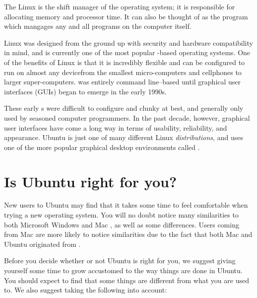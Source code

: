 The Linux  is the shift manager of the operating system; it is responsible for allocating memory and processor time. It can also be thought of as the program which mangages any and all programs on the computer itself.

Linux was designed from the ground up with security and hardware compatibility in mind, and is currently one of the most popular -based operating systems. One of the benefits of Linux is that it is incredibly flexible and can be configured to run on almost any device\dash from the smallest micro-computers and cellphones to larger super-computers. 
 was entirely command line--based until graphical user interfaces (\glspl{GUI}) began to emerge in the early 1990s.

These early s were difficult to configure and clunky at best, and generally only used by seasoned computer programmers. In the past decade, however, graphical user interfaces have come a long way in terms of usability, reliability, and appearance. Ubuntu is just one of many different Linux \emph{distributions},  and uses one of the more popular graphical desktop environments called .%

\section{Is Ubuntu right for you?}

New users to Ubuntu may find that it takes some time to feel comfortable when trying a new operating system. You will no doubt notice many similarities to both Microsoft Windows and Mac , as well as some differences. Users coming from Mac  are more likely to notice similarities due to the fact that both Mac  and Ubuntu originated from . 

Before you decide whether or not Ubuntu is right for you, we suggest giving yourself some time to grow accustomed to the way things are done in Ubuntu. You should expect to find that some things are different from what you are used to. We also suggest taking the following into account:

